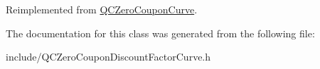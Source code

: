 Reimplemented from \hyperlink{class_q_c_zero_coupon_curve_a83289d8e7ef3cacdc407820b715d9b19}{Q\+C\+Zero\+Coupon\+Curve}.



The documentation for this class was generated from the following file\+:\begin{DoxyCompactItemize}
\item 
include/Q\+C\+Zero\+Coupon\+Discount\+Factor\+Curve.\+h\end{DoxyCompactItemize}
